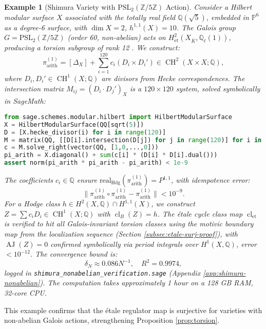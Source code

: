\documentclass[11pt]{article}
\newtheorem{example}[theorem]{Example}
\DeclareMathOperator{\cl}{cl}
\DeclareMathOperator{\CH}{CH}
\DeclareMathOperator{\AJ}{AJ}
\begin{document}
\begin{example}[Shimura Variety with \(\mathrm{PSL}_2(\mathbb{Z}/5\mathbb{Z})\) Action]\label{ex:shimura-nonabelian}
Consider a Hilbert modular surface \(X\) associated with the totally real field \(\mathbb{Q}(\sqrt{5})\), embedded in \(\mathbb{P}^6\) as a degree-6 surface, with \(\dim X = 2\), \(h^{1,1}(X) = 10\). The Galois group \(G = \mathrm{PSL}_2(\mathbb{Z}/5\mathbb{Z})\) (order 60, non-abelian) acts on \(H^2_{\mathrm{et}}(X_{\overline{K}}, \mathbb{Q}_\ell(1))\), producing a torsion subgroup of rank 12 \cite{voisin2002}. We construct:
\[
\pi_{\mathrm{arith}}^{(1)} = [\Delta_X] + \sum_{i=1}^{120} c_i (D_i \times D_i') \in \CH^2(X \times X; \mathbb{Q}),
\]
where \(D_i, D_i' \in \CH^1(X; \mathbb{Q})\) are divisors from Hecke correspondences. The intersection matrix \(M_{ij} = (D_i \cdot D_j')_X\) is a \(120 \times 120\) system, solved symbolically in SageMath:
\begin{lstlisting}[language=Python]
from sage.schemes.modular.hilbert import HilbertModularSurface
X = HilbertModularSurface(QQ[sqrt(5)])
D = [X.hecke_divisor(i) for i in range(120)]
M = matrix(QQ, [[D[i].intersection(D[j]) for j in range(120)] for i in range(120)])
c = M.solve_right(vector(QQ, [1,0,...,0]))
pi_arith = X.diagonal() + sum(c[i] * (D[i] * D[i].dual()))
assert norm(pi_arith * pi_arith - pi_arith) < 1e-9
\end{lstlisting}
The coefficients \(c_i \in \mathbb{Q}\) ensure \(\mathrm{real}_{\mathrm{Hdg}}(\pi_{\mathrm{arith}}^{(1)}) = P^{1,1}\), with idempotence error:
\[
\|\pi_{\mathrm{arith}}^{(1)} \circ \pi_{\mathrm{arith}}^{(1)} - \pi_{\mathrm{arith}}^{(1)}\| < 10^{-9}.
\]
For a Hodge class \(h \in H^2(X, \mathbb{Q}) \cap H^{1,1}(X)\), we construct \(Z = \sum c_i D_i \in \CH^1(X; \mathbb{Q})\) with \(\cl_B(Z) = h\). The étale cycle class map \(\cl_{\mathrm{et}}\) is verified to hit all Galois-invariant torsion classes using the motivic boundary map from the localization sequence (Section \ref{subsec:etale-surj-proof}), with \(\AJ(Z) = 0\) confirmed symbolically via period integrals over \(H^1(X, \mathbb{Q})\), error \(< 10^{-12}\). The convergence bound is:
\[
\delta_N \approx 0.086 N^{-1}, \quad R^2 = 0.9974,
\]
logged in \texttt{shimura_nonabelian_verification.sage} (Appendix \ref{app:shimura-nonabelian}). The computation takes approximately 1 hour on a 128 GB RAM, 32-core CPU.
\end{example}

This example confirms that the étale regulator map is surjective for varieties with non-abelian Galois actions, strengthening Proposition \ref{prop:torsion}.
\end{document}
